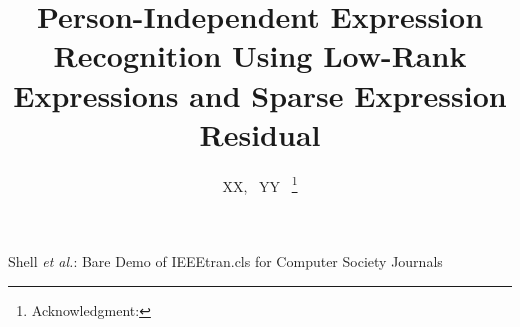 \documentclass[journal]{IEEEtran}
\begin{document}
%
\title{Person-Independent Expression Recognition Using Low-Rank Expressions and Sparse Expression Residual}
%
%
%

\author{XX,~
				YY~%
\thanks{\IEEEcompsocthanksitem Acknowledgment: \IEEEcompsocthanksitem 

}}


%
{Shell \MakeLowercase{\textit{et al.}}: Bare Demo of
IEEEtran.cls for Computer Society Journals}
\maketitle
\end{document}

